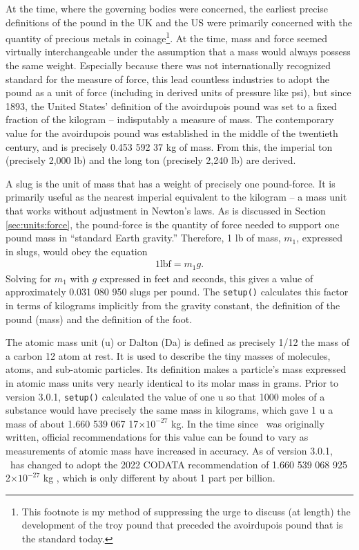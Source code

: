 At the time, where the governing bodies were concerned, the earliest precise definitions of the pound in the UK and the US were primarily concerned with the quantity of precious metals in coinage\footnote{This footnote is my method of suppressing the urge to discuss (at length) the development of the troy pound that preceded the avoirdupois pound that is the standard today.}.  At the time, mass and force seemed virtually interchangeable under the assumption that a mass would always possess the same weight.  Especially because there was not internationally recognized standard for the measure of force, this lead countless industries to adopt the pound as a unit of force (including in derived units of pressure like psi), but since 1893, the United States' definition of the avoirdupois pound was set to a fixed fraction of the kilogram -- indisputably a measure of mass.  The contemporary value for the avoirdupois pound was established in the middle of the twentieth century, and is precisely 0.453 592 37 kg of mass.\cite{nbs:1959}  From this, the imperial ton (precisely 2,000 lb) and the long ton (precisely 2,240 lb) are derived.

A slug is the unit of mass that has a weight of precisely one pound-force.  It is primarily useful as the nearest imperial equivalent to the kilogram -- a mass unit that works without adjustment in Newton's laws.  As is discussed in Section \ref{sec:units:force}, the pound-force is the quantity of force needed to support one pound mass in ``standard Earth gravity.''  Therefore, 1 lb of mass, $m_1$, expressed in slugs, would obey the equation
\begin{align}
1 \mathrm{lbf} = m_1 g.
\end{align}
Solving for $m_1$ with $g$ expressed in feet and seconds, this gives a value of approximately 0.031 080 950 slugs per pound.  The \texttt{setup()} calculates this factor in terms of kilograms implicitly from the gravity constant, the definition of the pound (mass) and the definition of the foot.

The atomic mass unit (u) or Dalton (Da) is defined as precisely 1/12 the mass of a carbon 12 atom at rest.  It is used to describe the tiny masses of molecules, atoms, and sub-atomic particles.  Its definition makes a particle's mass expressed in atomic mass units very nearly identical to its molar mass in grams.  Prior to version 3.0.1, \texttt{setup()} calculated the value of one u so that 1000 moles of a substance would have precisely the same mass in kilograms, which gave 1 u a mass of about 1.660 539 067 17$\times 10^{-27}$ kg.  In the time since \PM\ was originally written, official recommendations for this value can be found to vary as measurements of atomic mass have increased in accuracy.  As of version 3.0.1, \PM\ has changed to adopt the 2022 CODATA recommendation of 1.660 539 068 925 2$\times 10^{-27}$ kg \cite[pg. 54]{codata:2022}, which is only different by about 1 part per billion.  

